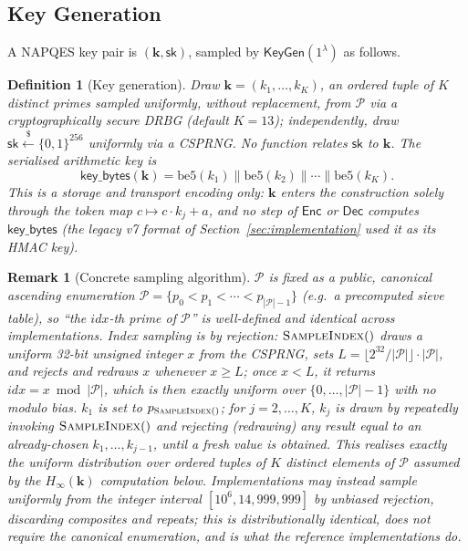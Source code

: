 \documentclass[11pt,a4paper]{article}
\newtheorem{definition}[theorem]{Definition}
\newtheorem{remark}[theorem]{Remark}
\begin{document}
\subsection{Key Generation}
\label{sec:keygen}

A NAPQES key pair is $(\mathbf{k}, \mathsf{sk})$, sampled by
$\mathsf{KeyGen}(1^\lambda)$ as follows.

\begin{definition}[Key generation]\label{def:keygen}
Draw $\mathbf{k} = (k_1,\ldots,k_K)$, an ordered tuple of $K$ distinct
primes sampled uniformly, without replacement, from $\mathcal{P}$ via a
cryptographically secure DRBG (default $K=13$); \emph{independently}, draw
$\mathsf{sk}\xleftarrow{\$}\{0,1\}^{256}$ uniformly via a CSPRNG. No
function relates $\mathsf{sk}$ to $\mathbf{k}$. The serialised arithmetic
key is
\[
  \mathsf{key\_bytes}(\mathbf{k}) = \mathrm{be5}(k_1) \| \mathrm{be5}(k_2) \| \cdots \| \mathrm{be5}(k_K).
\]
This is a storage and transport encoding only: $\mathbf{k}$ enters the
construction solely through the token map $c\mapsto c\cdot k_j+a$, and no
step of $\mathsf{Enc}$ or $\mathsf{Dec}$ computes $\mathsf{key\_bytes}$ (the
legacy v7 format of Section~\ref{sec:implementation} used it as its HMAC
key).
\end{definition}

\begin{remark}[Concrete sampling algorithm]\label{rem:sampling}
$\mathcal{P}$ is fixed as a public, canonical ascending enumeration
$\mathcal{P}=\{p_0<p_1<\cdots<p_{|\mathcal{P}|-1}\}$ (e.g.\ a precomputed
sieve table), so ``the $idx$-th prime of $\mathcal{P}$'' is well-defined
and identical across implementations. Index sampling is by rejection:
$\textsc{SampleIndex}()$ draws a uniform 32-bit unsigned integer $x$ from
the CSPRNG, sets $L=\lfloor 2^{32}/|\mathcal{P}|\rfloor\cdot|\mathcal{P}|$,
and rejects and redraws $x$ whenever $x\geq L$; once $x<L$, it returns
$idx=x\bmod|\mathcal{P}|$, which is then exactly uniform over
$\{0,\ldots,|\mathcal{P}|-1\}$ with no modulo bias. $k_1$ is set to
$p_{\textsc{SampleIndex}()}$; for $j=2,\ldots,K$, $k_j$ is drawn by
repeatedly invoking $\textsc{SampleIndex}()$ and rejecting (redrawing) any
result equal to an already-chosen $k_1,\ldots,k_{j-1}$, until a fresh
value is obtained. This realises exactly the uniform distribution over
ordered tuples of $K$ distinct elements of $\mathcal{P}$ assumed by the
$H_\infty(\mathbf{k})$ computation below. Implementations may instead
sample uniformly from the integer interval $[10^6,14{,}999{,}999]$ by
unbiased rejection, discarding composites and repeats; this is
distributionally identical, does not require the canonical enumeration,
and is what the reference implementations do.
\end{remark}
\end{document}
